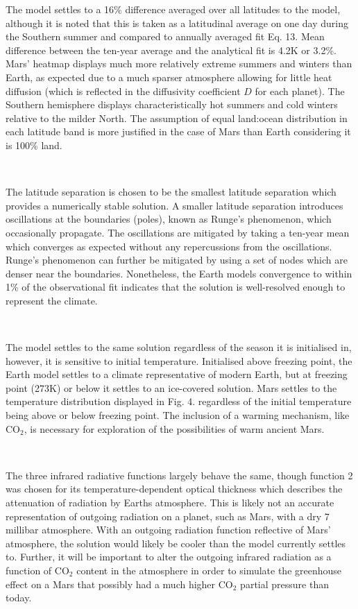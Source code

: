 \documentclass[12pt,onecolumn]{revtex4-2}    %
\begin{document}
The model settles to a 16\% difference averaged over all latitudes to the model, although it is noted that this is taken as a latitudinal average on one day during the Southern summer and compared to annually averaged fit Eq. 13. Mean difference between the ten-year average and the analytical fit is 4.2K or 3.2\%.
Mars' heatmap displays much more relatively extreme summers and winters than Earth, as expected due to a much sparser atmosphere allowing for little heat diffusion (which is reflected in the diffusivity coefficient $D$ for each planet). The Southern hemisphere displays characteristically hot summers and cold winters relative to the milder North. The assumption of equal land:ocean distribution in each latitude band is more justified in the case of Mars than Earth considering it is 100\% land.

\

The latitude separation is chosen to be the smallest latitude separation which provides a numerically stable solution. A smaller latitude separation introduces oscillations at the boundaries (poles), known as Runge's phenomenon, which occasionally propagate. The oscillations are mitigated by taking a ten-year mean which converges as expected without any repercussions from the oscillations. Runge's phenomenon can further be mitigated by using a set of nodes which are denser near the boundaries. Nonetheless, the Earth models convergence to within 1\% of the observational fit indicates that the solution is well-resolved enough to represent the climate.

\

The model settles to the same solution regardless of the season it is initialised in, however, it is sensitive to initial temperature. Initialised above freezing point, the Earth model settles to a climate representative of modern Earth, but at freezing point (273K) or below it settles to an ice-covered solution. Mars settles to the temperature distribution displayed in Fig. 4. regardless of the initial temperature being above or below freezing point. The inclusion of a warming mechanism, like $\mathrm{CO_2}$, is necessary for exploration of the possibilities of warm ancient Mars.

\

The three infrared radiative functions largely behave the same, though function 2 was chosen for its temperature-dependent optical thickness which describes the attenuation of radiation by Earths atmosphere. This is likely not an accurate representation of outgoing radiation on a planet, such as Mars, with a dry 7 millibar atmosphere. With an outgoing radiation function reflective of Mars' atmosphere, the solution would likely be cooler than the model currently settles to. Further, it will be important to alter the outgoing infrared radiation as a function of $\mathrm{CO_2}$ content in the atmosphere in order to simulate the greenhouse effect on a Mars that possibly had a much higher $\mathrm{CO_2}$ partial pressure than today.
\end{document}
